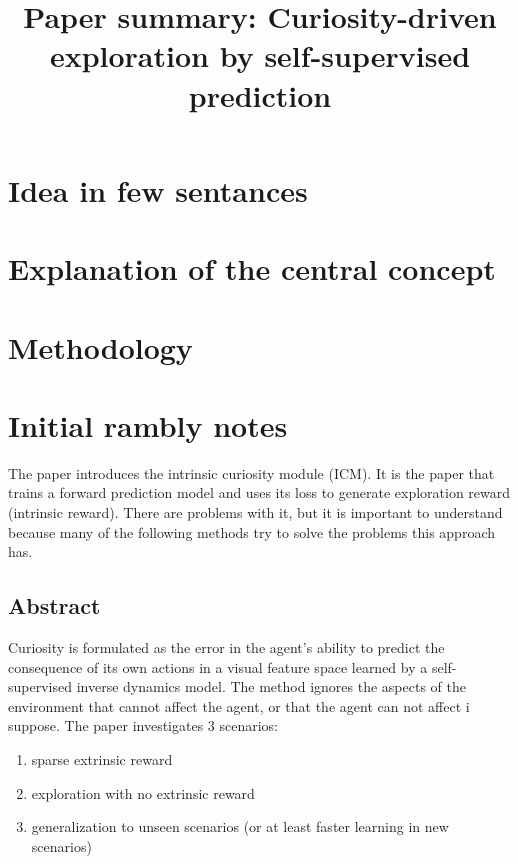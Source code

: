 \documentclass{article}
\title{Paper summary: Curiosity-driven exploration by self-supervised prediction}
\begin{document}
\maketitle


\section{Idea in few sentances}



\section{Explanation of the central concept}




\section{Methodology}


\section{Initial rambly notes}
The paper introduces the intrinsic curiosity module (ICM). It is the paper
that trains a forward prediction model and uses its loss to generate exploration reward (intrinsic reward).
There are problems with it, but it is important to understand because many of the following
methods try to solve the problems this approach has.

\subsection{Abstract}
Curiosity is formulated as the error in the agent's ability to predict
the consequence of its own actions in a visual feature space learned by a self-supervised 
inverse dynamics model.
The method ignores the aspects of the environment that cannot affect the agent, or that the agent
can not affect i suppose.
The paper investigates 3 scenarios:
\begin{enumerate}
		\item sparse extrinsic reward
		\item exploration with no extrinsic reward
		\item generalization to unseen scenarios (or at least faster learning in new scenarios)
\end{enumerate}
\end{document}
